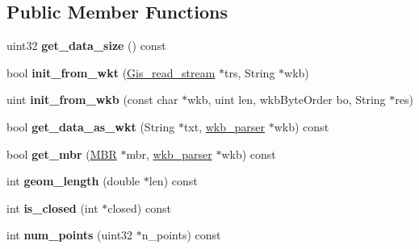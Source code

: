\subsection*{Public Member Functions}
\begin{DoxyCompactItemize}
\item 
\mbox{\label{classGis__line__string_a872d47c8093c4af980bfc959fab4c183}} 
uint32 {\bfseries get\+\_\+data\+\_\+size} () const
\item 
\mbox{\label{classGis__line__string_a2f8296a0a3aa541ba1c63369da9b8760}} 
bool {\bfseries init\+\_\+from\+\_\+wkt} (\mbox{\hyperlink{classGis__read__stream}{Gis\+\_\+read\+\_\+stream}} $\ast$trs, String $\ast$wkb)
\item 
\mbox{\label{classGis__line__string_a7bd482da0b7486cd4a4b48151be3a9f9}} 
uint {\bfseries init\+\_\+from\+\_\+wkb} (const char $\ast$wkb, uint len, wkb\+Byte\+Order bo, String $\ast$res)
\item 
\mbox{\label{classGis__line__string_ad1e2f41ec1e235682d3cd26d3d524e39}} 
bool {\bfseries get\+\_\+data\+\_\+as\+\_\+wkt} (String $\ast$txt, \mbox{\hyperlink{classGeometry_1_1wkb__parser}{wkb\+\_\+parser}} $\ast$wkb) const
\item 
\mbox{\label{classGis__line__string_a306ce2711caccb784a92a21141f853e6}} 
bool {\bfseries get\+\_\+mbr} (\mbox{\hyperlink{structMBR}{M\+BR}} $\ast$mbr, \mbox{\hyperlink{classGeometry_1_1wkb__parser}{wkb\+\_\+parser}} $\ast$wkb) const
\item 
\mbox{\label{classGis__line__string_a07ac69ea51bc8a14f06c5438ac3dd8c3}} 
int {\bfseries geom\+\_\+length} (double $\ast$len) const
\item 
\mbox{\label{classGis__line__string_af1296af3c09e22077eed8bd890f9db6e}} 
int {\bfseries is\+\_\+closed} (int $\ast$closed) const
\item 
\mbox{\label{classGis__line__string_abfc1ccbab09330a940c54ba2a7a5850c}} 
int {\bfseries num\+\_\+points} (uint32 $\ast$n\+\_\+points) const
\item 

\end{DoxyCompactItemize}
